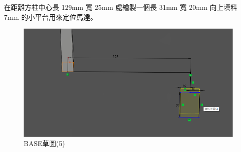在距離方柱中心長 129mm 寬 25mm 處繪製一個長 31mm 寬 20mm 向上填料 7mm 的小平台用來定位馬達。

\begin{figure}[h!]
    \centering
    \begin{minipage}[b]{0.6\textwidth}
        \centering
        \includegraphics[width=\textwidth,height=0.30\textheight]{./../images/6-1-33}
        \caption{BASE草圖(5)}
        \label{fig:platform}
    \end{minipage}
    \hfill
    \begin{minipage}[b]{0.35\textwidth}
        \centering

\end{minipage}
\end{figure}

